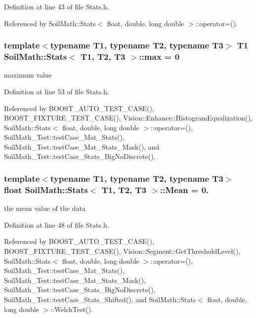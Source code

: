 Definition at line 43 of file Stats.\+h.



Referenced by Soil\+Math\+::\+Stats$<$ float, double, long double $>$\+::operator=().

\hypertarget{class_soil_math_1_1_stats_ad49ee1f533564ec587cf98a094b8c564}{}
\subsubsection[{max}]{\setlength{\rightskip}{0pt plus 5cm}template$<$typename T1, typename T2, typename T3$>$ T1 {\bf Soil\+Math\+::\+Stats}$<$ T1, T2, T3 $>$\+::max = 0}\label{class_soil_math_1_1_stats_ad49ee1f533564ec587cf98a094b8c564}
maximum value 

Definition at line 53 of file Stats.\+h.



Referenced by B\+O\+O\+S\+T\+\_\+\+A\+U\+T\+O\+\_\+\+T\+E\+S\+T\+\_\+\+C\+A\+S\+E(), B\+O\+O\+S\+T\+\_\+\+F\+I\+X\+T\+U\+R\+E\+\_\+\+T\+E\+S\+T\+\_\+\+C\+A\+S\+E(), Vision\+::\+Enhance\+::\+Histogram\+Equalization(), Soil\+Math\+::\+Stats$<$ float, double, long double $>$\+::operator=(), Soil\+Math\+\_\+\+Test\+::test\+Case\+\_\+\+Mat\+\_\+\+Stats(), Soil\+Math\+\_\+\+Test\+::test\+Case\+\_\+\+Mat\+\_\+\+Stats\+\_\+\+Mask(), and Soil\+Math\+\_\+\+Test\+::test\+Case\+\_\+\+Stats\+\_\+\+Big\+No\+Discrete().

\hypertarget{class_soil_math_1_1_stats_a6f53982d52cf492ddd4df9b56bd014e7}{}
\subsubsection[{Mean}]{\setlength{\rightskip}{0pt plus 5cm}template$<$typename T1, typename T2, typename T3$>$ float {\bf Soil\+Math\+::\+Stats}$<$ T1, T2, T3 $>$\+::Mean = 0.}\label{class_soil_math_1_1_stats_a6f53982d52cf492ddd4df9b56bd014e7}
the mean value of the data 

Definition at line 48 of file Stats.\+h.



Referenced by B\+O\+O\+S\+T\+\_\+\+A\+U\+T\+O\+\_\+\+T\+E\+S\+T\+\_\+\+C\+A\+S\+E(), B\+O\+O\+S\+T\+\_\+\+F\+I\+X\+T\+U\+R\+E\+\_\+\+T\+E\+S\+T\+\_\+\+C\+A\+S\+E(), Vision\+::\+Segment\+::\+Get\+Threshold\+Level(), Soil\+Math\+::\+Stats$<$ float, double, long double $>$\+::operator=(), Soil\+Math\+\_\+\+Test\+::test\+Case\+\_\+\+Mat\+\_\+\+Stats(), Soil\+Math\+\_\+\+Test\+::test\+Case\+\_\+\+Mat\+\_\+\+Stats\+\_\+\+Mask(), Soil\+Math\+\_\+\+Test\+::test\+Case\+\_\+\+Stats\+\_\+\+Big\+No\+Discrete(), Soil\+Math\+\_\+\+Test\+::test\+Case\+\_\+\+Stats\+\_\+\+Shifted(), and Soil\+Math\+::\+Stats$<$ float, double, long double $>$\+::\+Welch\+Test().

